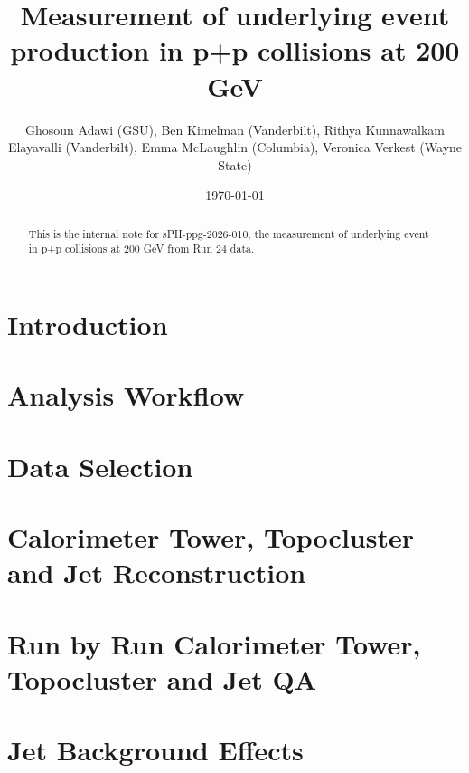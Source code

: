 \documentclass[type=report,linenumbering=on]{sphenix}
\begin{document}
\title{Measurement of underlying event production in p+p collisions at 200 GeV}
\author{Ghosoun Adawi (GSU), Ben Kimelman (Vanderbilt), Rithya Kunnawalkam Elayavalli (Vanderbilt), Emma McLaughlin (Columbia), Veronica Verkest (Wayne State)}
\date{\today}



\maketitle

\begin{abstract}
This is the internal note for sPH-ppg-2026-010, the measurement of underlying event in p+p collisions at 200 GeV from Run 24 data.
\end{abstract}

\tableofcontents

\section{Introduction} 
\label{sec:introduction}


\section{Analysis Workflow}
\label{sec:workflow}


\section{Data Selection}
\label{sec:selection}


\section{Calorimeter Tower, Topocluster and Jet Reconstruction}
\label{sec:towerreco}


\section{Run by Run Calorimeter Tower, Topocluster and Jet QA}
\label{sec:runbyrunqa}


\section{Jet Background Effects} 
\label{sec:jetbackground}

\end{document}
